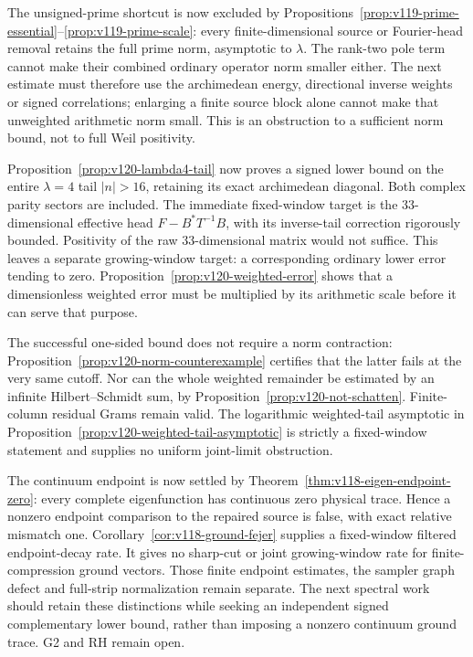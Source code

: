 \documentclass[11pt]{article}
\theoremstyle{remark}
\begin{document}
The unsigned-prime shortcut is now excluded by
Propositions~\ref{prop:v119-prime-essential}--\ref{prop:v119-prime-scale}:
every finite-dimensional source or Fourier-head removal retains the
full prime norm, asymptotic to $\lambda$. The rank-two pole term cannot
make their combined ordinary operator norm smaller either. The next
estimate must therefore use the archimedean energy, directional inverse
weights or signed correlations; enlarging a finite source block alone
cannot make that unweighted arithmetic norm small. This is an
obstruction to a sufficient norm bound, not to full Weil positivity.

Proposition~\ref{prop:v120-lambda4-tail} now proves a signed lower
bound on the entire $\lambda=4$ tail $|n|>16$, retaining its exact
archimedean diagonal. Both complex parity sectors are included.
The immediate fixed-window target is the $33$-dimensional effective
head $F-B^*T^{-1}B$, with its inverse-tail correction rigorously
bounded. Positivity of the raw $33$-dimensional matrix would not suffice.
This leaves a separate growing-window target: a corresponding ordinary
lower error tending to zero. Proposition~\ref{prop:v120-weighted-error}
shows that a dimensionless weighted error must be multiplied by its
arithmetic scale before it can serve that purpose.

The successful one-sided bound does not require a norm contraction:
Proposition~\ref{prop:v120-norm-counterexample} certifies that the
latter fails at the very same cutoff. Nor can the whole weighted
remainder be estimated by an infinite Hilbert--Schmidt sum, by
Proposition~\ref{prop:v120-not-schatten}. Finite-column residual Grams
remain valid. The logarithmic weighted-tail asymptotic in
Proposition~\ref{prop:v120-weighted-tail-asymptotic} is strictly a
fixed-window statement and supplies no uniform joint-limit obstruction.

The continuum endpoint is now settled by
Theorem~\ref{thm:v118-eigen-endpoint-zero}: every complete eigenfunction
has continuous zero physical trace. Hence a nonzero endpoint comparison
to the repaired source is false, with exact relative mismatch one.
Corollary~\ref{cor:v118-ground-fejer} supplies a fixed-window filtered
endpoint-decay rate. It gives no sharp-cut or joint growing-window rate
for finite-compression ground vectors. Those finite endpoint estimates,
the sampler graph defect and full-strip normalization remain separate.
The next spectral work should retain these distinctions while seeking
an independent signed complementary lower bound, rather than imposing
a nonzero continuum ground trace. G2 and RH remain open.
\end{document}
